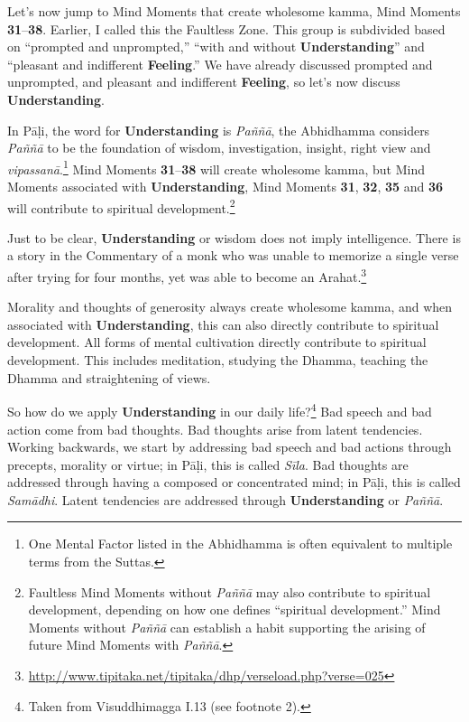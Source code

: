 Let’s now jump to Mind Moments that create wholesome kamma, Mind Moments \textbf{31}--\textbf{38}. Earlier, I called this the Faultless Zone. This group is subdivided based on “prompted and unprompted,” “with and without \textbf{Understanding}” and “pleasant and indifferent \textbf{Feeling}.” We have already discussed prompted and unprompted, and pleasant and indifferent \textbf{Feeling}, so let’s now discuss \textbf{Understanding}.

In Pāḷi, the word for \textbf{Understanding} is \textit{Paññā}, the Abhidhamma considers \textit{Paññā} to be the foundation of wisdom, investigation, insight, right view and \textit{vipassanā}.\footnote{One Mental Factor listed in the Abhidhamma is often equivalent to multiple terms from the Suttas.} Mind Moments \textbf{31}--\textbf{38} will create wholesome kamma, but Mind Moments associated with \textbf{Understanding}, Mind Moments \textbf{31}, \textbf{32}, \textbf{35} and \textbf{36} will contribute to spiritual development.\footnote{Faultless Mind Moments without \textit{Paññā} may also contribute to spiritual development, depending on how one defines “spiritual development.” Mind Moments without \textit{Paññā} can establish a habit supporting the arising of future Mind Moments with \textit{Paññā}.}

Just to be clear, \textbf{Understanding} or wisdom does not imply intelligence. There is a story in the Commentary of a monk who was unable to memorize a single verse after trying for four months, yet was able to become an Arahat.\footnote{\url{http://www.tipitaka.net/tipitaka/dhp/verseload.php?verse=025}}

Morality and thoughts of generosity always create wholesome kamma, and when associated with \textbf{Understanding}, this can also directly contribute to spiritual development. All forms of mental cultivation directly contribute to spiritual development. This includes meditation, studying the Dhamma, teaching the Dhamma and straightening of views.

So how do we apply \textbf{Understanding} in our daily life?\footnote{Taken from Visuddhimagga I.13 (see footnote 2).} Bad speech and bad action come from bad thoughts. Bad thoughts arise from latent tendencies. Working backwards, we start by addressing bad speech and bad actions through precepts, morality or virtue; in Pāḷi, this is called \textit{Sīla}. Bad thoughts are addressed through having a composed or concentrated mind; in Pāḷi, this is called \textit{Samādhi}. Latent tendencies are addressed through \textbf{Understanding} or \textit{Paññā}.

